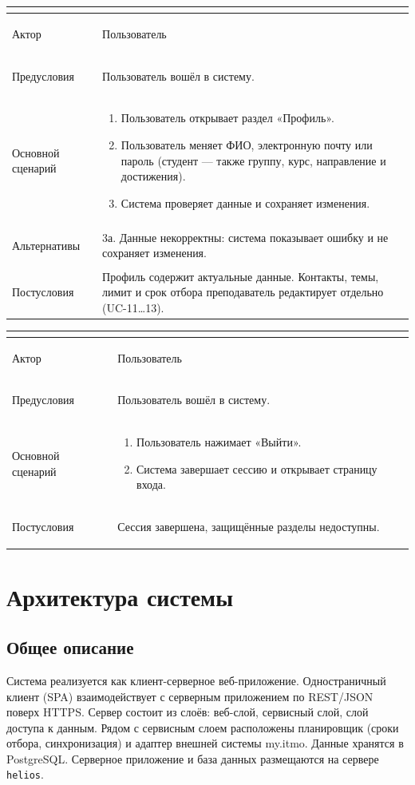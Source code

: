 \documentclass[a4paper,12pt]{article}
\newenvironment{ucd}[3]{%
  \needspace{10\baselineskip}
  \begin{longtable}{|>{\bfseries\raggedright\arraybackslash}p{3.0cm}|p{11.8cm}|}
  \hline
  \multicolumn{2}{|l|}{\textbf{#1.\ #2}}\\ \hline
  Актор & #3\\ \hline
}{\end{longtable}}
\newcommand{\steps}[1]{\begin{enumerate}[nosep,leftmargin=*]#1\end{enumerate}}
\begin{document}
\begin{ucd}{UC-49}{Редактировать профиль}{Пользователь}
Предусловия & Пользователь вошёл в систему.\\ \hline
Основной сценарий & \steps{
 \item Пользователь открывает раздел «Профиль».
 \item Пользователь меняет ФИО, электронную почту или пароль (студент — также группу, курс, направление и достижения).
 \item Система проверяет данные и сохраняет изменения.}\\ \hline
Альтернативы & 3а. Данные некорректны: система показывает ошибку и не сохраняет изменения.\\ \hline
Постусловия & Профиль содержит актуальные данные. Контакты, темы, лимит и срок отбора преподаватель редактирует отдельно (UC-11…13).\\ \hline
\end{ucd}

\begin{ucd}{UC-50}{Выйти из системы}{Пользователь}
Предусловия & Пользователь вошёл в систему.\\ \hline
Основной сценарий & \steps{
 \item Пользователь нажимает «Выйти».
 \item Система завершает сессию и открывает страницу входа.}\\ \hline
Постусловия & Сессия завершена, защищённые разделы недоступны.\\ \hline
\end{ucd}

\section{Архитектура системы}

\subsection{Общее описание}
Система реализуется как клиент-серверное веб-приложение. Одностраничный клиент (SPA) взаимодействует с серверным приложением по REST/JSON поверх HTTPS. Сервер состоит из слоёв: веб-слой, сервисный слой, слой доступа к данным. Рядом с сервисным слоем расположены планировщик (сроки отбора, синхронизация) и адаптер внешней системы my.itmo. Данные хранятся в PostgreSQL. Серверное приложение и база данных размещаются на сервере \texttt{helios}.
\end{document}

